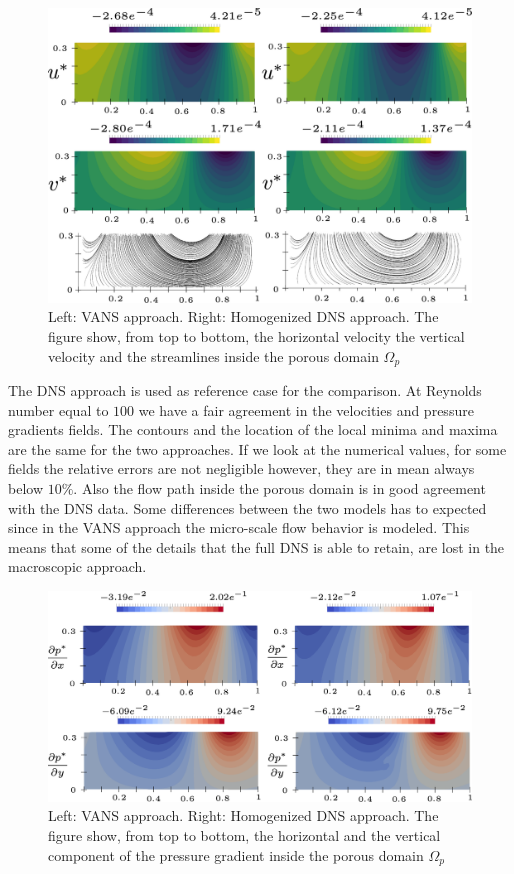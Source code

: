 \begin{figure}[H]
	\centering
	\includegraphics[width=1\linewidth]{chapter_5/figure/re100/vans_u}
	\caption{Left: VANS approach. Right: Homogenized DNS approach. The figure show, from top to bottom, the horizontal velocity the vertical velocity and the streamlines inside the porous domain $\Omega_p$}
	\label{fig:100_u}
\end{figure}

The DNS approach is used as reference case for the comparison. At Reynolds number equal to $100$ we have a fair agreement in the velocities and pressure gradients fields. The contours and the location of the local minima and maxima are the same for the two approaches. If we look at the numerical values, for some fields the relative errors are not negligible however, they are in mean always below $10\%$. Also the flow path inside the porous domain is in good agreement with the DNS data.
Some differences between the two models has to expected since in the VANS approach the micro-scale flow behavior is modeled. This means that some of the details that the full DNS is able to retain, are lost in the macroscopic approach. 

\begin{figure}[H]
	\centering
	\includegraphics[width=1\linewidth]{chapter_5/figure/re100/vans_p}
	\caption{Left: VANS approach. Right: Homogenized DNS approach. The figure show, from top to bottom, the horizontal and the vertical component of the pressure gradient inside the porous domain $\Omega_p$}
	\label{fig:100_p}
\end{figure}



